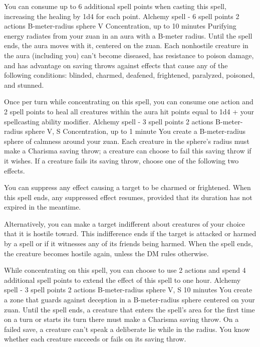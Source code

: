         You can consume up to 6 additional spell points when casting this spell, increasing the healing by 1d4 for each point.
        {Alchemy spell - 6 spell points}
        {2 actions}
        {B-meter-radius sphere}
        {V}
        {Concentration, up to 10 minutes}
        Purifying energy radiates from your zuan in an aura with a B-meter radius.
        Until the spell ends, the aura moves with it, centered on the zuan.
        Each nonhostile creature in the aura (including you) can't become diseased, has resistance to poison damage, and has advantage on saving throws against effects that cause any of the following conditions: blinded, charmed, deafened, frightened, paralyzed, poisoned, and stunned.

        Once per turn while concentrating on this spell, you can consume one action and 2 spell points to heal all creatures within the aura hit points equal to 1d4 + your spellcasting ability modifier.
        {Alchemy spell - 3 spell points}
        {2 actions}
        {B-meter-radius sphere}
        {V, S}
        {Concentration, up to 1 minute}
        You create a B-meter-radius sphere of calmness around your zuan.
        Each creature in the sphere's radius must make a Charisma saving throw; a creature can choose to fail this saving throw if it wishes.
        If a creature fails its saving throw, choose one of the following two effects.

        You can suppress any effect causing a target to be charmed or frightened.
        When this spell ends, any suppressed effect resumes, provided that its duration has not expired in the meantime.

        Alternatively, you can make a target indifferent about creatures of your choice that it is hostile toward.
        This indifference ends if the target is attacked or harmed by a spell or if it witnesses any of its friends being harmed.
        When the spell ends, the creature becomes hostile again, unless the DM rules otherwise.

        While concentrating on this spell, you can choose to use 2 actions and spend 4 additional spell points to extend the effect of this spell to one hour.
        {Alchemy spell - 3 spell points}
        {2 actions}
        {B-meter-radius sphere}
        {V, S}
        {10 minutes}
        You create a zone that guards against deception in a B-meter-radius sphere centered on your zuan.
        Until the spell ends, a creature that enters the spell's area for the first time on a turn or starts its turn there must make a Charisma saving throw.
        On a failed save, a creature can't speak a deliberate lie while in the radius.
        You know whether each creature succeeds or fails on its saving throw.

